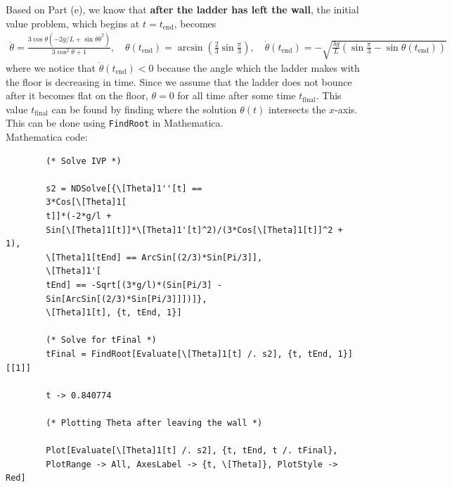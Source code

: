 \documentclass{article}
\theoremstyle{definition}
\newcommand{\f}[2]{\frac{#1}{#2}}
\newcommand{\lp}{\left(}
\newcommand{\rp}{\right)}
\begin{document}
\begin{enumerate}[label = (\alph*)]
		Based on Part (e), we know that \textbf{after the ladder has left the wall}, the initial value problem, which begins at $t=t_\text{end}$, becomes 
		\begin{align*}
		\ddot\theta= \frac{3\cos \theta \left(-2g/L + \sin\theta \dot\theta^2\right)}{ 3\cos^2\theta+1}, \quad \theta(t_\text{end})  = \arcsin\lp \f{2}{3}\sin\f{\pi}{3} \rp, \quad \dot\theta(t_\text{end}) = -\sqrt{\f{3g}{L}\lp\sin\f{\pi}{3}-\sin\theta(t_\text{end})\rp}
		\end{align*}
		where we notice that $\dot\theta(t_\text{end}) < 0$ because the angle which the ladder makes with the floor is decreasing in time. Since we assume that the ladder does not bounce after it becomes flat on the floor, $\theta=0$ for all time after some time $t_\text{final}$. This value $t_\text{final}$ can be found by finding where the solution $\theta(t)$ intersects the $x$-axis. This can be done using \texttt{FindRoot} in Mathematica. \\
		
		
		Mathematica code:
		\begin{lstlisting}
		(* Solve IVP *)
		
		s2 = NDSolve[{\[Theta]1''[t] == 
		3*Cos[\[Theta]1[
		t]]*(-2*g/l + 
		Sin[\[Theta]1[t]]*\[Theta]1'[t]^2)/(3*Cos[\[Theta]1[t]]^2 + 1),
		\[Theta]1[tEnd] == ArcSin[(2/3)*Sin[Pi/3]],
		\[Theta]1'[
		tEnd] == -Sqrt[(3*g/l)*(Sin[Pi/3] - 
		Sin[ArcSin[(2/3)*Sin[Pi/3]]])]},
		\[Theta]1[t], {t, tEnd, 1}]
		
		(* Solve for tFinal *)
		tFinal = FindRoot[Evaluate[\[Theta]1[t] /. s2], {t, tEnd, 1}][[1]]
		
		t -> 0.840774
		
		(* Plotting Theta after leaving the wall *)
		
		Plot[Evaluate[\[Theta]1[t] /. s2], {t, tEnd, t /. tFinal}, 
		PlotRange -> All, AxesLabel -> {t, \[Theta]}, PlotStyle -> Red]
		\end{lstlisting}
		

\end{enumerate}
\end{document}
